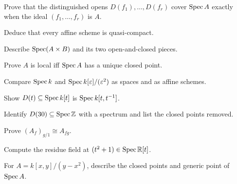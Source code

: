 \begin{exercise}\label{ex:vi18-12}
Prove that the distinguished opens $D(f_1),\dots,D(f_r)$ cover $\operatorname{Spec} A$ exactly when the ideal $(f_1,\dots,f_r)$ is $A$.
\end{exercise}

\begin{exercise}\label{ex:vi18-13}
Deduce that every affine scheme is quasi-compact.
\end{exercise}

\begin{exercise}\label{ex:vi18-14}
Describe $\operatorname{Spec}(A\times B)$ and its two open-and-closed pieces.
\end{exercise}

\begin{exercise}\label{ex:vi18-15}
Prove $A$ is local iff $\operatorname{Spec} A$ has a unique closed point.
\end{exercise}

\begin{exercise}\label{ex:vi18-16}
Compare $\operatorname{Spec} k$ and $\operatorname{Spec} k[\varepsilon]/(\varepsilon^2)$ as spaces and as affine schemes.
\end{exercise}

\begin{exercise}\label{ex:vi18-17}
Show $D(t)\subseteq\operatorname{Spec} k[t]$ is $\operatorname{Spec} k[t,t^{-1}]$.
\end{exercise}

\begin{exercise}\label{ex:vi18-18}
Identify $D(30)\subseteq\operatorname{Spec}\mathbb Z$ with a spectrum and list the closed points removed.
\end{exercise}

\begin{exercise}\label{ex:vi18-19}
Prove $(A_f)_{g/1}\cong A_{fg}$.
\end{exercise}

\begin{exercise}\label{ex:vi18-20}
Compute the residue field at $(t^2+1)\in\operatorname{Spec}\mathbb R[t]$.
\end{exercise}

\begin{exercise}\label{ex:vi18-21}
For $A=k[x,y]/(y-x^2)$, describe the closed points and generic point of $\operatorname{Spec} A$.
\end{exercise}

